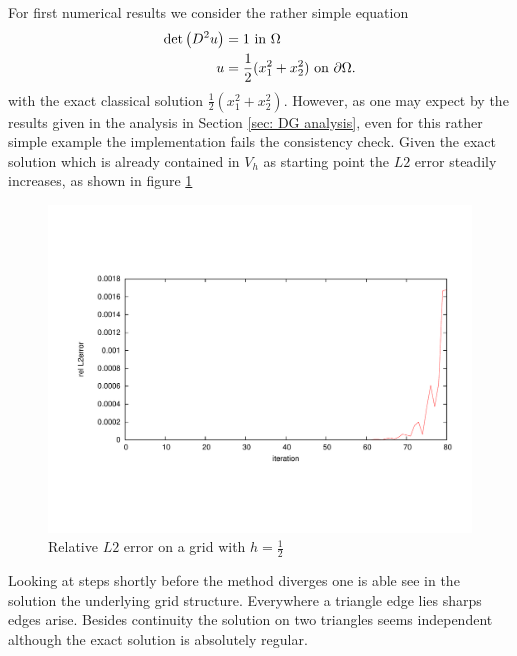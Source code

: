 For first numerical results we consider the rather simple equation
\begin{align}
	\det{\left(D^2 u\right)} &= 1 \text{ in } \Omega \\ 
	u &= \frac 1 2 (x_1^2 + x_2^2 )\text{ on }\partial \Omega.	
\end{align}
with the exact classical solution $\frac 1 2 (x_1^2 + x_2^2 )$. However, as one may expect by the results given in the analysis in Section \ref{sec: DG analysis}, even for this rather simple example the implementation fails the consistency check. Given the exact solution which is already contained in $V_h$ as starting point the $L2$ error steadily increases, as shown in figure \ref{fig: consisctency_first_try}
\begin{figure}[h]
	\centering
	\includegraphics[trim = 2cm 4cm 1cm 4cm, width=1\textwidth]{plots/consisctency_first_try.pdf}
	\caption{Relative $L2$ error on a grid with $h=\frac 1 2$}
	\label{fig: consisctency_first_try}
\end{figure}
Looking at steps shortly before the method diverges one is able see in the solution the underlying grid structure. Everywhere a triangle edge lies sharps edges arise. Besides continuity the solution on two triangles seems independent although the exact solution is absolutely  regular.

